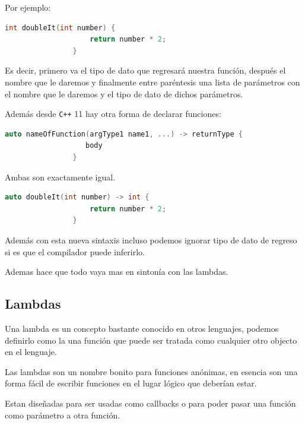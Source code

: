 \documentclass[12pt, fleqn]{report}                             %
\theoremstyle{break}                                            %
\newcommand{\textCode}[1]  { \texttt{#1} }                      %
\newcommand \Cpp  {\textCode{C++} }                               %
\begin{document}
            Por ejemplo:
            \begin{lstlisting}[language=C++, gobble=16]
                int doubleIt(int number) {
                    return number * 2;
                }
            \end{lstlisting}

            Es decir, primero va el tipo de dato que regresará nuestra función, después el nombre que le
            daremos y finalmente entre paréntesis una lista de parámetros con el nombre que le daremos y el
            tipo de dato de dichos parámetros.

            Además desde \Cpp 11 hay otra forma de declarar funciones:
            \begin{lstlisting}[language=C++, gobble=16]
                auto nameOfFunction(argType1 name1, ...) -> returnType {
                   body
                }
            \end{lstlisting}

            Ambas son exactamente igual.
            \begin{lstlisting}[language=C++, gobble=16]
                auto doubleIt(int number) -> int {
                    return number * 2;
                }
            \end{lstlisting}

            Además con esta nueva sintaxis incluso podemos ignorar tipo de dato de regreso si es que el
            compilador puede inferirlo.

            Ademas hace que todo vaya mas en sintonía con las lambdas.

            
            \clearpage
            \subsection{Lambdas}

                Una lambda es un concepto bastante conocido en otros lenguajes, podemos definirlo como 
                la una función que puede ser tratada como cualquier otro objecto en el lenguaje.

                Las lambdas son un nombre bonito para funciones anónimas, en esencia son una forma fácil
                de escribir funciones en el lugar lógico que deberían estar.

                Estan diseñadas para ser usadas como callbacks o para poder pasar una función como parámetro
                a otra función.
\end{document}
